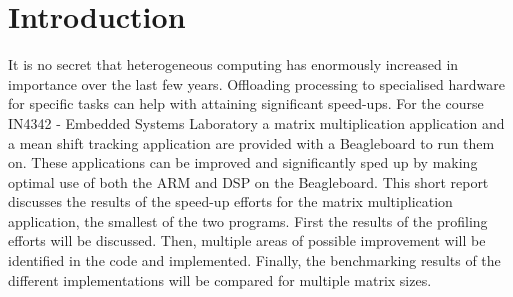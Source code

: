 \documentclass[final]{article}
\begin{document}
\section{Introduction}
It is no secret that heterogeneous computing has enormously increased in importance over the last few years. Offloading processing to specialised hardware for specific tasks can help with attaining significant speed-ups. For the course IN4342 - Embedded Systems Laboratory a matrix multiplication application and a mean shift tracking application are provided with a Beagleboard to run them on. These applications can be improved and significantly sped up by making optimal use of both the ARM and DSP on the Beagleboard. This short report discusses the results of the speed-up efforts for the matrix multiplication application, the smallest of the two programs. First the results of the profiling efforts will be discussed. Then, multiple areas of possible improvement will be identified in the code and implemented. Finally, the benchmarking results of the different implementations will be compared for multiple matrix sizes.
\end{document}
